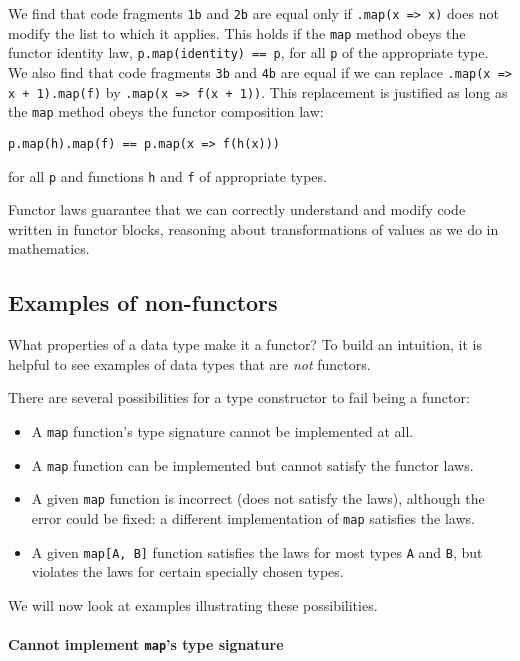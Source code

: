 We find that code fragments \lstinline!1b! and \lstinline!2b! are
equal only if \lstinline!.map(x => x)! does not modify the list to
which it applies. This holds if the \lstinline!map! method obeys
the functor identity law, \lstinline!p.map(identity) == p!, for all
\lstinline!p! of the appropriate type. We also find that code fragments
\lstinline!3b! and \lstinline!4b! are equal if we can replace \lstinline!.map(x => x + 1).map(f)!
by \lstinline!.map(x => f(x + 1))!. This replacement is justified
as long as the \lstinline!map! method obeys the functor composition
law:
\begin{lstlisting}
p.map(h).map(f) == p.map(x => f(h(x)))
\end{lstlisting}
for all \lstinline!p! and functions \lstinline!h! and \lstinline!f!
of appropriate types.

Functor laws guarantee that we can correctly understand and modify
code written in functor blocks, reasoning about transformations of
values as we do in mathematics.

\subsection{Examples of non-functors\label{subsec:Examples-of-non-functors}}

What properties of a data type make it a functor? To build an intuition,
it is helpful to see examples of data types that are \emph{not} functors.

There are several possibilities for a type constructor to fail being
a functor:
\begin{itemize}
\item A \lstinline!map! function\textsf{'}s type signature cannot be implemented
at all.
\item A \lstinline!map! function can be implemented but cannot satisfy
the functor laws.
\item A given \lstinline!map! function is incorrect (does not satisfy the
laws), although the error could be fixed: a different implementation
of \lstinline!map! satisfies the laws.
\item A given \lstinline!map[A, B]! function satisfies the laws for most
types \lstinline!A! and \lstinline!B!, but violates the laws for
certain specially chosen types.
\end{itemize}
We will now look at examples illustrating these possibilities.

\paragraph{Cannot implement \texttt{map}\textsf{'}s type signature}

